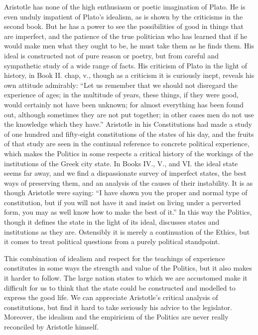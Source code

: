 Aristotle has none of the high enthusiasm or poetic imagination of Plato.
He is even unduly impatient of Plato's idealism, as is shown by the
criticisms in the second book. But he has a power to see the possibilities
of good in things that are imperfect, and the patience of the true
politician who has learned that if he would make men what they ought to
be, he must take them as he finds them. His ideal is constructed not of
pure reason or poetry, but from careful and sympathetic study of a wide
range of facts. His criticism of Plato in the light of history, in Book
II. chap, v., though as a criticism it is curiously inept, reveals his own
attitude admirably: ``Let us remember that we should not disregard the
experience of ages; in the multitude of years, these things, if they were
good, would certainly not have been unknown; for almost everything has
been found out, although sometimes they are not put together; in other
cases men do not use the knowledge which they have.'' Aristotle in his
Constitutions had made a study of one hundred and fifty-eight
constitutions of the states of his day, and the fruits of that study are
seen in the continual reference to concrete political experience, which
makes the Politics in some respects a critical history of the workings of
the institutions of the Greek city state. In Books IV., V., and VI. the
ideal state seems far away, and we find a dispassionate survey of
imperfect states, the best ways of preserving them, and an analysis of the
causes of their instability. It is as though Aristotle were saying: ``I
have shown you the proper and normal type of constitution, but if you will
not have it and insist on living under a perverted form, you may as well
know how to make the best of it.'' In this way the Politics, though it
defines the state in the light of its ideal, discusses states and
institutions as they are. Ostensibly it is merely a continuation of the
Ethics, but it comes to treat political questions from a purely political
standpoint.

This combination of idealism and respect for the teachings of experience
constitutes in some ways the strength and value of the Politics, but it
also makes it harder to follow. The large nation states to which we are
accustomed make it difficult for us to think that the state could be
constructed and modelled to express the good life. We can appreciate
Aristotle's critical analysis of constitutions, but find it hard to take
seriously his advice to the legislator. Moreover, the idealism and the
empiricism of the Politics are never really reconciled by Aristotle
himself.

